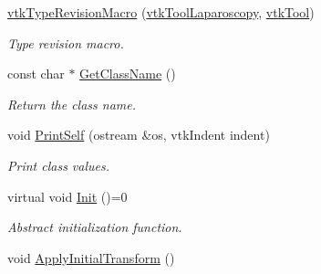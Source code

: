 \begin{DoxyCompactItemize}
\item 
\hypertarget{classvtkToolLaparoscopy_a972d62685a18d4f960f75859745ef84b}{
\hyperlink{classvtkToolLaparoscopy_a972d62685a18d4f960f75859745ef84b}{vtkTypeRevisionMacro} (\hyperlink{classvtkToolLaparoscopy}{vtkToolLaparoscopy}, \hyperlink{classvtkTool}{vtkTool})}
\label{classvtkToolLaparoscopy_a972d62685a18d4f960f75859745ef84b}

\begin{DoxyCompactList}\small\item\em Type revision macro. \item\end{DoxyCompactList}\item 
\hypertarget{classvtkToolLaparoscopy_ad44b0b82bd511ef8c2b67053145450f6}{
const char $\ast$ \hyperlink{classvtkToolLaparoscopy_ad44b0b82bd511ef8c2b67053145450f6}{GetClassName} ()}
\label{classvtkToolLaparoscopy_ad44b0b82bd511ef8c2b67053145450f6}

\begin{DoxyCompactList}\small\item\em Return the class name. \item\end{DoxyCompactList}\item 
\hypertarget{classvtkToolLaparoscopy_a87de6397c41e834633bc532f7338b904}{
void \hyperlink{classvtkToolLaparoscopy_a87de6397c41e834633bc532f7338b904}{PrintSelf} (ostream \&os, vtkIndent indent)}
\label{classvtkToolLaparoscopy_a87de6397c41e834633bc532f7338b904}

\begin{DoxyCompactList}\small\item\em Print class values. \item\end{DoxyCompactList}\item 
virtual void \hyperlink{classvtkToolLaparoscopy_ace75ea21a3ddb27547976ddea0ebb60e}{Init} ()=0
\begin{DoxyCompactList}\small\item\em Abstract initialization function. \item\end{DoxyCompactList}\item 
\hypertarget{classvtkToolLaparoscopy_a55c7ce0e9156ae3547dbe32a4fef1057}{
void \hyperlink{classvtkToolLaparoscopy_a55c7ce0e9156ae3547dbe32a4fef1057}{ApplyInitialTransform} ()}
\label{classvtkToolLaparoscopy_a55c7ce0e9156ae3547dbe32a4fef1057}


\end{DoxyCompactItemize}
